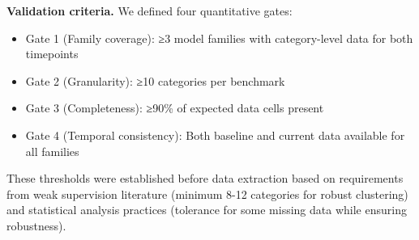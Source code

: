 \textbf{Validation criteria.} We defined four quantitative gates:
\begin{itemize}
\item Gate 1 (Family coverage): ≥3 model families with category-level data for both timepoints
\item Gate 2 (Granularity): ≥10 categories per benchmark
\item Gate 3 (Completeness): ≥90\% of expected data cells present
\item Gate 4 (Temporal consistency): Both baseline and current data available for all families
\end{itemize}

These thresholds were established before data extraction based on requirements from weak supervision literature (minimum 8-12 categories for robust clustering) and statistical analysis practices (tolerance for some missing data while ensuring robustness).

